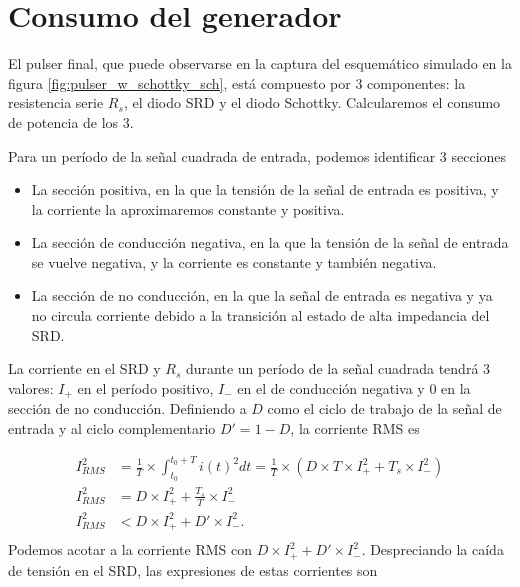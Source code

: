 \section{Consumo del generador}
\label{sec:pulser_power}

El pulser final, que puede observarse en la captura del esquemático simulado en
la figura \ref{fig:pulser_w_schottky_sch}, está compuesto por 3 componentes: la
resistencia serie $R_s$, el diodo SRD y el diodo Schottky. Calcularemos el
consumo de potencia de los 3.

Para un período de la señal cuadrada de entrada, podemos identificar 3 secciones

\begin{itemize}
    \item La sección positiva, en la que la tensión de la señal de entrada es
        positiva, y la corriente la aproximaremos constante y positiva.
    \item La sección de conducción negativa, en la que la tensión de la señal de
        entrada se vuelve negativa, y la corriente es constante y también
        negativa.
    \item La sección de no conducción, en la que la señal de entrada es
        negativa y ya no circula corriente debido a la transición al estado de
        alta impedancia del SRD.
\end{itemize}

La corriente en el SRD y $R_s$ durante un período de la señal cuadrada tendrá 3
valores: $I_+$ en el período positivo, $I_-$ en el de conducción negativa y $0$
en la sección de no conducción. Definiendo a $D$ como el ciclo de trabajo de la
señal de entrada y al ciclo complementario $D'=1-D$, la corriente RMS es

\begin{equation}
    \begin{aligned}
        I_{RMS}^2 &= \frac{1}{T} \times \int_{t_0}^{t_0+T} i(t)^2dt = \frac{1}{T}
        \times \left( D \times T \times I_+^2 + T_s \times I_-^2 \right) \\
        I_{RMS}^2 &= D \times I_+^2 + \frac{T_s}{T} \times I_-^2 \\
        I_{RMS}^2 &< D \times I_+^2 + D' \times I_-^2. \\
    \end{aligned}
\end{equation}
Podemos acotar a la corriente RMS con $D \times I_+^2 + D' \times I_-^2$.
Despreciando la caída de tensión en el SRD, las expresiones de estas corrientes son

